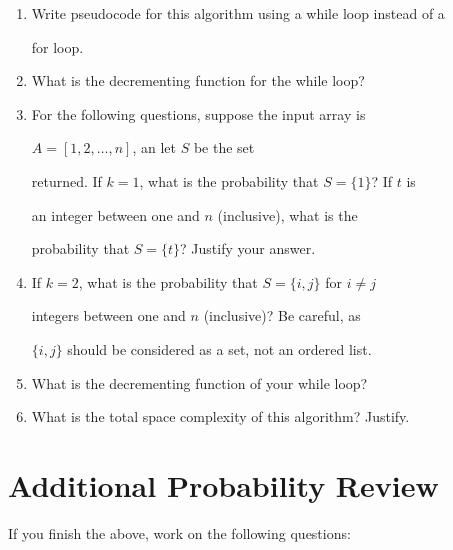 \documentclass{article}
\begin{document}
\begin{enumerate}

    \item Write pseudocode for this algorithm using a while loop instead of a

        for loop.

    \item What is the decrementing function for the while loop?

    \item For the following questions, suppose the input array is

        $A=[1,2,\ldots,n]$, an let $S$ be the set

        returned. If $k=1$, what is the probability that $S=\{1\}$?  If $t$ is

        an integer between one and $n$ (inclusive), what is the

        probability that $S=\{t\}$?  Justify your answer.

    \item If $k=2$, what is the probability that $S=\{i,j\}$ for $i \neq j$

        integers between one and $n$ (inclusive)? Be careful, as

        $\{i,j\}$ should be considered as a set, not an ordered list.

    \item What is the decrementing function of your while loop?

    \item What is the total space complexity of this algorithm? Justify.

\end{enumerate}



\section*{Additional Probability Review}

If you finish the above, work on the following questions:
\end{document}
